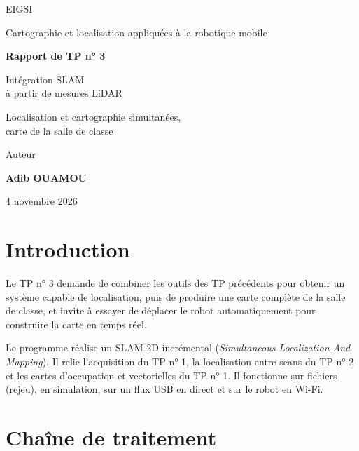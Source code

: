 \documentclass[11pt,a4paper]{article}
\newcommand{\code}[1]{\texttt{\detokenize{#1}}}
\begin{document}
\begin{titlepage}
\centering
\vspace*{1.8cm}
{\Large EIGSI\par}
\vspace{0.5cm}
{\large Cartographie et localisation appliquées à la robotique mobile\par}
\vspace{2cm}
{\Huge\bfseries Rapport de TP n° 3\par}
\vspace{0.7cm}
{\LARGE Intégration SLAM\\à partir de mesures LiDAR\par}
\vspace{0.9cm}
{\large Localisation et cartographie simultanées,\\carte de la salle de classe\par}
\vfill
{\large Auteur\par}
\vspace{0.2cm}
{\LARGE\bfseries Adib OUAMOU\par}
\vspace{1cm}
{\large 4 novembre 2026\par}
\vspace{1cm}
\end{titlepage}

\begingroup
\setlength{\parskip}{0pt}
\tableofcontents
\endgroup
\newpage
{}

\section*{Introduction}
Le TP n° 3 demande de combiner les outils des TP précédents pour obtenir un
système capable de localisation, puis de produire une carte complète de la
salle de classe, et invite à essayer de déplacer le robot automatiquement
pour construire la carte en temps réel.

Le programme \code{slam_tp3.py} réalise un SLAM 2D incrémental
(\emph{Simultaneous Localization And Mapping}). Il relie l'acquisition du
TP n° 1, la localisation entre scans du TP n° 2 et les cartes d'occupation
et vectorielles du TP n° 1. Il fonctionne sur fichiers (rejeu), en
simulation, sur un flux USB en direct et sur le robot en Wi-Fi.

\section{Chaîne de traitement}
\end{document}
